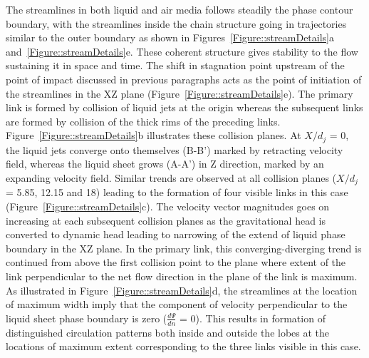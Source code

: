 \documentclass[%
aip,
sd,%
amsmath,amssymb,
preprint,%
author-year,%
]{revtex4-1}
\begin{document}
The streamlines in both liquid and air media follows steadily the phase contour boundary, with the streamlines inside the chain structure going in trajectories similar to the outer boundary as shown in Figures~\ref{Figure::streamDetails}a and~\ref{Figure::streamDetails}e. These coherent structure gives stability to the flow sustaining it in space and time. The shift in stagnation point upstream of the point of impact discussed in previous paragraphs acts as the point of initiation of the streamlines in the XZ plane (Figure~\ref{Figure::streamDetails}e). The primary link is formed by collision of liquid jets at the origin whereas the subsequent links are formed by collision of the thick rims of the preceding links. Figure~\ref{Figure::streamDetails}b illustrates these collision planes. At $X/d_j$ = 0, the liquid jets converge onto themselves (B-B') marked by retracting velocity field, whereas the liquid sheet grows (A-A') in Z direction, marked by an expanding velocity field. Similar trends are observed at all collision planes ($X/d_j$ = 5.85, 12.15 and 18) leading to the formation of four visible links in this case (Figure~\ref{Figure::streamDetails}c). The velocity vector magnitudes goes on increasing at each subsequent collision planes as the gravitational head is converted to dynamic head leading to narrowing of the extend of liquid phase boundary in the XZ plane. In the primary link, this converging-diverging trend is continued from above the first collision point to the plane where extent of the link perpendicular to the net flow direction in the plane of the link is maximum. As illustrated in Figure~\ref{Figure::streamDetails}d, the streamlines at the location of maximum width imply that the component of velocity perpendicular to the liquid sheet phase boundary is zero ($\frac{d\Psi}{dn}$ = 0). This results in formation of distinguished circulation patterns both inside and outside the lobes at the locations of maximum extent corresponding to the three links visible in this case. \\
\end{document}
